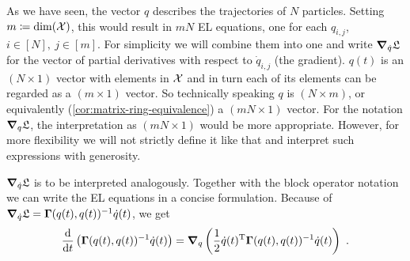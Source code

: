 As we have seen, the vector $q$ describes the trajectories of $N$ particles.
Setting $m \coloneqq \mathrm{dim}(\mathcal{X})$, this would result in $mN$ EL equations, one for each $q_{i, j}$, $i \in [N],\ j \in [m]$.
For simplicity we will combine them into one and write $\grad_{\dot{q}} \mathfrak{L}$ for the vector of partial derivatives with respect to $\dot{q}_{i, j}$ (the gradient).
$q(t)$ is an $(N\times1)$ vector with elements in $\mathcal{X}$ and in turn each of its elements can be regarded as a $(m\times1)$ vector.
So technically speaking $q$ is $(N \times m)$, or equivalently (\cref{cor:matrix-ring-equivalence}) a $(mN \times 1)$ vector.
For the notation $\grad_q \mathfrak{L}$, the interpretation as $(mN \times 1)$ would be more appropriate.
However, for more flexibility we will not strictly define it like that and interpret such expressions with generosity.

$\grad_{\dot{q}} \mathfrak{L}$ is to be interpreted analogously.
Together with the block operator notation we can write the EL equations in a concise formulation.
Because of $\grad_{\dot{q}} \mathfrak{L} = \mathbf{\Gamma}(q(t), q(t))^{-1} \dot{q}(t)$, we get
\begin{equation}
\label{eq:concrete-lagrangian}
	\frac{\mathrm{d}}{\mathrm{d}t} \left(\mathbf{\Gamma}(q(t), q(t))^{-1} \dot{q}(t) \right)
	= \grad_q \left(\frac{1}{2} \dot{q}(t)^\mathrm{T} \mathbf{\Gamma}(q(t), q(t))^{-1} \dot{q}(t)\right) \ .
\end{equation}
